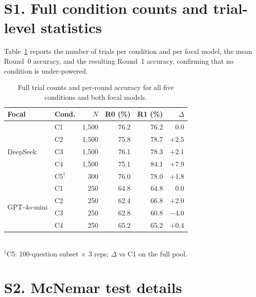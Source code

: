 \documentclass[11pt]{article}
\begin{document}


\appendix

\section*{S1. Full condition counts and trial-level statistics}
\label{ssec:counts}

Table~\ref{stab:fullcounts} reports the number of trials per condition and
per focal model, the mean Round~0 accuracy, and the resulting Round~1
accuracy, confirming that no condition is under-powered.

\begin{table}[h]
\centering
\footnotesize
\caption{Full trial counts and per-round accuracy for all five conditions
and both focal models.
\label{stab:fullcounts}}
\begin{tabular}{@{}llrrrr@{}}
\toprule
Focal & Cond. & $N$ & R0 (\%) & R1 (\%) & $\Delta$ \\
\midrule
\multirow{5}{*}{DeepSeek}
  & C1 & 1{,}500 & 76.2 & 76.2 & 0.0 \\
  & C2 & 1{,}500 & 75.8 & 78.7 & $+$2.5 \\
  & C3 & 1{,}500 & 76.1 & 78.3 & $+$2.1 \\
  & C4 & 1{,}500 & 75.1 & 84.1 & $+$7.9 \\
  & C5$^{\dagger}$ & 300   & 76.0 & 78.0 & $+$1.8 \\
\midrule
\multirow{4}{*}{GPT-4o-mini}
  & C1 & 250   & 64.8 & 64.8 & 0.0 \\
  & C2 & 250   & 62.4 & 66.8 & $+$2.0 \\
  & C3 & 250   & 62.8 & 60.8 & $-$4.0 \\
  & C4 & 250   & 65.2 & 65.2 & $+$0.4 \\
\bottomrule
\end{tabular}
\\[2pt]
{\scriptsize $^{\dagger}$C5: 100-question subset $\times$ 3 reps;
$\Delta$ vs C1 on the full pool.}
\end{table}

\section*{S2. McNemar test details}
\label{ssec:mcnemar}
\end{document}
